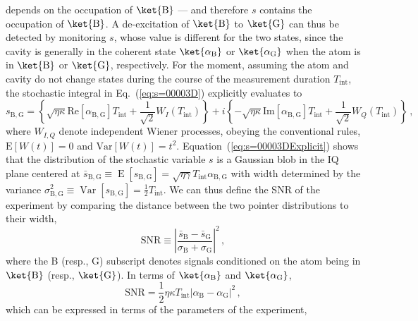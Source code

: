 depends on the occupation of $\ket{\mathrm{B}}$ --- and therefore
$s$ contains the occupation of $\ket{\mathrm{B}}$. A de-excitation
of $\ket{\mathrm{B}}$ to $\ket{\mathrm{G}}$ can thus be detected
by monitoring $s$, whose value is different for the two states, since
the cavity is generally in the coherent state $\ket{\alpha_{\mathrm{B}}}$
or $\ket{\alpha_{\mathrm{G}}}$ when the atom is in $\ket{\mathrm{B}}$
or $\ket{\mathrm{G}}$, respectively. For the moment, assuming the
atom and cavity do not change states during the course of the measurement
duration $T_{\mathrm{int}}$, the stochastic integral in Eq.~(\ref{eq:s=00003D})
explicitly evaluates to 
\begin{equation}
s_{\mathrm{B,G}}=\left\{ \sqrt{\eta\kappa}\mathrm{Re}\left[\alpha_{\mathrm{B,G}}\right]T_{\mathrm{int}}+\frac{1}{\sqrt{2}}W_{I}\left(T_{\mathrm{int}}\right)\right\} +i\left\{ -\sqrt{\eta\kappa}\mathrm{Im}\left[\alpha_{\mathrm{B,G}}\right]T_{\mathrm{int}}+\frac{1}{\sqrt{2}}W_{Q}\left(T_{\mathrm{int}}\right)\right\} \,,\label{eq:s=00003DExplicit}
\end{equation}
where $W_{I,Q}$ denote independent Wiener processes, obeying the
conventional rules, $\mathrm{E}\left[W\left(t\right)\right]=0$ and
$\mathrm{Var}\left[W\left(t\right)\right]=t^{2}$. Equation~(\ref{eq:s=00003DExplicit})
shows that the distribution of the stochastic variable $s$ is a Gaussian
blob in the IQ plane centered at $\bar{s}_{\mathrm{B,G}}\equiv\operatorname{E}\left[s_{\mathrm{B,G}}\right]=\sqrt{\eta\gamma}T_{\mathrm{int}}\alpha_{\mathrm{B,G}}$
with width determined by the variance $\sigma_{\mathrm{B,G}}^{2}\equiv\operatorname{Var}\left[s_{\mathrm{B,G}}\right]=\frac{1}{2}T_{\mathrm{int}}$.
We can thus define the SNR of the experiment by comparing the distance
between the two pointer distributions to their width, 
\begin{equation}
\mathrm{SNR}\equiv\left|\frac{\bar{s}_{\mathrm{B}}-\bar{s}_{\mathrm{G}}}{\sigma_{\mathrm{B}}+\sigma_{\mathrm{G}}}\right|^{2}\,,\label{eq:SNR-defn}
\end{equation}
where the B (resp., G) subscript denotes signals conditioned on the
atom being in $\ket{\mathrm{B}}$ (resp., $\ket{\mathrm{G}}$). In
terms of $\ket{\alpha_{\mathrm{B}}}$ and $\ket{\alpha_{\mathrm{G}}}$,
\begin{equation}
\mathrm{SNR}=\frac{1}{2}\eta\kappa T_{\mathrm{int}}\left|\alpha_{\mathrm{B}}-\alpha_{\mathrm{G}}\right|^{2}\,,
\end{equation}
which can be expressed in terms of the parameters of the experiment,
